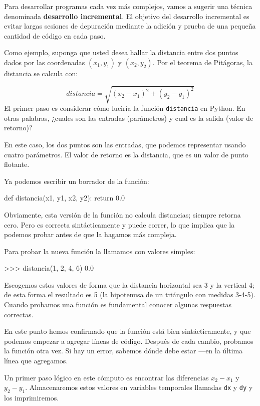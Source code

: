 Para desarrollar programas cada vez más complejos, vamos a sugerir
una técnica denominada \textbf{desarrollo incremental}. El objetivo
del desarrollo incremental es evitar largas sesiones de depuración
mediante la adición y prueba de una pequeña cantidad de código en
cada paso.

 

Como ejemplo, suponga que usted desea hallar la distancia entre dos
puntos dados por las coordenadas $(x_{1},y_{1})$ y $(x_{2},y_{2})$.
Por el teorema de Pitágoras, la distancia se calcula con:

\begin{equation}
distancia=\sqrt{(x_{2}-x_{1})^{2}+(y_{2}-y_{1})^{2}}
\end{equation}
El primer paso es considerar cómo luciría la función \texttt{distancia}
en Python. En otras palabras, ¿cuales son las entradas (parámetros)
y cual es la salida (valor de retorno)?

En este caso, los dos puntos son las entradas, que podemos representar
usando cuatro parámetros. El valor de retorno es la distancia, que
es un valor de punto flotante.

Ya podemos escribir un borrador de la función:

\begin{pythoncode}
def distancia(x1, y1, x2, y2):
  return 0.0
\end{pythoncode}
 Obviamente, esta versión de la función no calcula distancias; siempre
retorna cero. Pero es correcta sintácticamente y puede correr, lo
que implica que la podemos probar antes de que la hagamos más compleja.

Para probar la nueva función la llamamos con valores simples:

\begin{pyconcode}
>>> distancia(1, 2, 4, 6)
0.0
\end{pyconcode}
 Escogemos estos valores de forma que la distancia horizontal sea
3 y la vertical 4; de esta forma el resultado es 5 (la hipotenusa
de un triángulo con medidas 3-4-5). Cuando probamos una función es
fundamental conocer algunas respuestas correctas.

En este punto hemos confirmado que la función está bien sintácticamente,
y que podemos empezar a agregar líneas de código. Después de cada
cambio, probamos la función otra vez. Si hay un error, sabemos dónde
debe estar —en la última línea que agregamos.

Un primer paso lógico en este cómputo es encontrar las diferencias
$x_{2}-x_{1}$ y $y_{2}-y_{1}$. Almacenaremos estos valores en variables
temporales llamadas \texttt{dx} y \texttt{dy} y los imprimiremos.

